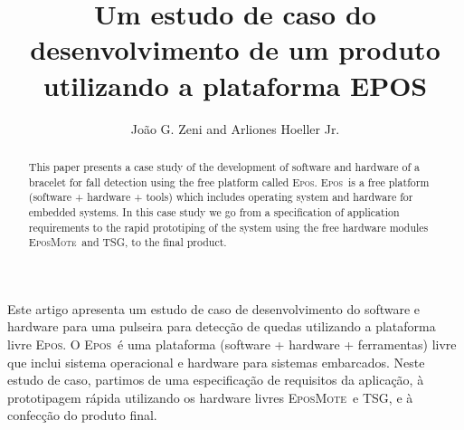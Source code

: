 \documentclass[12pt]{article}
\title{Um estudo de caso do desenvolvimento de um produto utilizando a plataforma EPOS}
\author{João G. Zeni and Arliones Hoeller Jr.}
\newcommand{\epos}{\textsc{Epos}}
\newcommand{\emote}{\textsc{EposMote}}
\newcommand{\tsg}{\textsc{TSG}}
\begin{document}
\maketitle

\begin{abstract}
This paper presents a case study of the development of software and hardware of a bracelet for fall detection using the free platform called \epos. \epos~is a free platform (software + hardware + tools) which includes operating system and hardware for embedded systems. In this case study we go from a specification of application requirements to the rapid prototiping of the system using the free hardware modules \emote~and \tsg, to the final product.
\end{abstract}

\begin{resumo} 
Este artigo apresenta um estudo de caso de desenvolvimento do software e hardware para uma pulseira para detecção de quedas utilizando a plataforma livre \epos. O \epos~é uma plataforma (software + hardware + ferramentas) livre que inclui sistema operacional e hardware para sistemas embarcados. Neste estudo de caso, partimos de uma especificação de requisitos da aplicação, à prototipagem rápida utilizando os hardware livres \emote~e \tsg, e à confecção do produto final.
\end{resumo}











\end{document}
